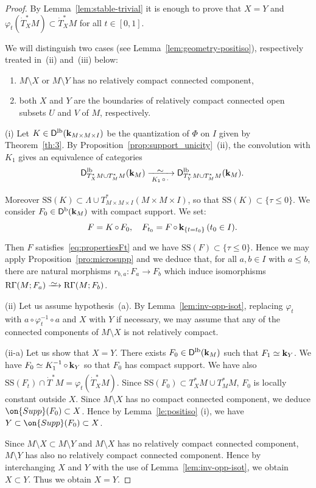 \documentclass[12pt,leqno]{article}
\theoremstyle{definition}
\def\phi{{\varphi}}
\newcommand{\cor}{{\bf k}}
\renewcommand{\to}[1][]{\xrightarrow[]{#1}}
\newcommand{\isoto}[1][]{\xrightarrow[#1]%
{{\raisebox{-.6ex}[0ex][-.6ex]{$\mspace{1mu}\sim\mspace{2mu}$}}}}
\newcommand{\rsect}{\mathrm{R}\Gamma}
\newcommand{\conv}[1][]{\mathop{\circ}\limits_{#1}}
\newcommand{\opb}[1]{#1^{-1}}
\newcommand{\cl}{\colon}
\newcommand{\banum}{\begin{enumerate}[{\rm(a)}]}
\newcommand{\eanum}{\end{enumerate}}
\newcommand{\eqn}{\begin{eqnarray*}}
\newcommand{\eneqn}{\end{eqnarray*}}
\newcommand{\Supp}{\on{Supp}}
\newcommand{\Der}[1][]{\mathsf{D}^{#1}}
\newcommand{\Derb}{\Der[\mathrm{b}]}
\newcommand{\Derlb}{\Der[\mathrm{lb}]}
\newcommand{\SSi}{\mathrm{SS}}
\newcommand{\dT}{{\dot{T}}}
\numberwithin{equation}{section}
\begin{document}
\begin{proof}
By Lemma~\ref{lem:stable-trivial} it is enough to prove that
$X=Y$ and $\phi_t(\dT^*_XM)\subset \dT^*_XM$ for all $t\in[0,1]$.

We will distinguish two cases (see Lemma~\ref{lem:geometry-positiso}), respectively treated in~(ii)
and~(iii) below:
\banum
\item $M\setminus X$ or $M\setminus Y$ has no relatively
compact connected component,
\item both $X$ and $Y$ are the boundaries of relatively compact connected open
  subsets $U$ and $V$ of $M$, respectively.
\eanum

\medskip
\noindent
(i) Let $K\in\Derlb(\cor_{M\times M\times I})$ be the quantization of $\Phi$
on $I$ given by Theorem~\ref{th:3}. 
By Proposition~\ref{prop:support_unicity}~(ii),
the convolution with $K_1$ gives an equivalence of categories
\eqn
&&\Derlb_{T^*_XM\cup T^*_MM}(\cor_M)
\isoto[\;K_1\conv\cdot\ ]\Derlb_{T^*_YM \cup T^*_MM}(\cor_M).
\eneqn
Moreover
$\SSi(K)\subset\Lambda\cup T^*_{M\times M\times I}(M\times M\times I)$,
so that $\SSi(K)\subset \{ \tau \leq 0 \}$. 
We consider $F_0\in \Derb(\cor_M)$ with compact support.
We set:
\eqn
&&F=K\conv F_0,\quad F_{t_0}=F\conv\cor_{\{t=t_0\}} \, (t_0\in I).
\eneqn
Then $F$ satisfies~\eqref{eq:propertiesFt} and we have
$\SSi(F)\subset \{ \tau \leq 0 \}$.  Hence we may apply
Proposition~\ref{pro:microsupp} and we deduce that,
for all $a,b\in I$ with $a\leq b$,
there are natural morphisms $r_{b,a}\cl F_a\to F_b$ which induce isomorphisms
$\rsect(M;F_a) \isoto \rsect(M;F_b)$.

\medskip\noindent
(ii) Let us assume hypothesis~(a).
By Lemma~\ref{lem:inv-opp-isot}, 
replacing $\phi_t$ with $a\circ\opb{\phi_t}\circ a$
and $X$ with $Y$ if necessary,
we may assume that any of the connected
components of $M\setminus X$ is not relatively compact.

\smallskip\noindent
(ii-a) Let us show that $X=Y$.
There exists $F_0\in \Derlb(\cor_M)$ such that $F_1\simeq \cor_Y$.
We have $F_0 \simeq K_1^{-1} \conv \cor_Y$ so that $F_0$ has compact support.
We have also $\SSi(F_t)\cap \dT^*M=\phi_t(\dT^*_XM)$.
Since $\SSi(F_0) \subset T^*_XM \cup T^*_MM$, $F_0$ is locally constant
outside $X$. Since $M\setminus X$ has no compact connected component, we
deduce $\Supp(F_0) \subset X$.
Hence by Lemma~\ref{le:positiso} (i),
we have $Y\subset \Supp(F_0)\subset X$.

Since $M\setminus X\subset M\setminus Y$ and $M\setminus X$ has no relatively compact connected component,
$M\setminus Y$ has also no relatively compact connected component.
Hence by interchanging $X$ and $Y$ with the use of Lemma~\ref{lem:inv-opp-isot}, 
we obtain $X\subset Y$.
Thus we obtain $X=Y$.



\end{proof}
\end{document}
